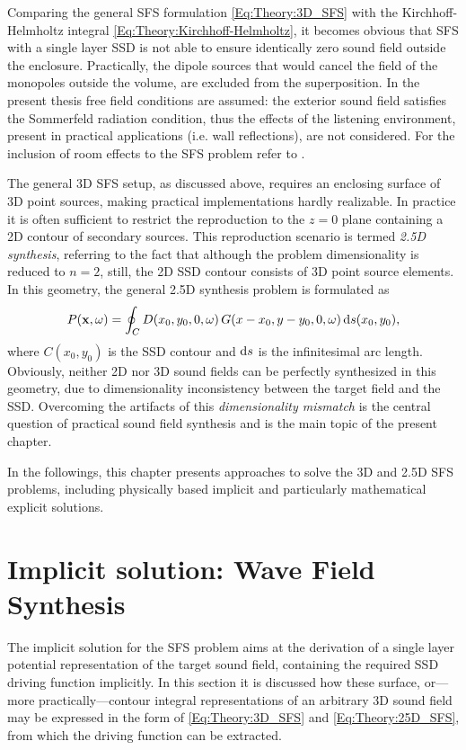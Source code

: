 Comparing the general SFS formulation \eqref{Eq:Theory:3D_SFS} with the Kirchhoff-Helmholtz integral \eqref{Eq:Theory:Kirchhoff-Helmholtz}, it becomes obvious that SFS with a single layer SSD is not able to ensure identically zero sound field outside the enclosure.
Practically, the dipole sources that would cancel the field of the monopoles outside the volume, are excluded from the superposition.
In the present thesis free field conditions are assumed: the exterior sound field satisfies the Sommerfeld radiation condition, thus the effects of the listening environment, present in practical applications (i.e. wall reflections), are not considered. 
For the inclusion of room effects to the SFS problem refer to \cite{Spors2005, app8010016}.

\vspace{3mm}
The general 3D SFS setup, as discussed above, requires an enclosing surface of 3D point sources, making practical implementations hardly realizable.
In practice it is often sufficient to restrict the reproduction to the $z=0$ plane containing a 2D contour of secondary sources.
This reproduction scenario is termed \emph{2.5D synthesis}, referring to the fact that although the problem dimensionality is reduced to $n=2$, still, the 2D SSD contour consists of 3D point source elements.
In this geometry, the general 2.5D synthesis problem is formulated as
\begin{equation}
P(\mathbf{x},\omega) = \oint_{C} D(x_0,y_0,0,\omega) \, G(x - x_0, y-y_0, 0 , \omega ) \, \mathrm{d} s( x_0, y_0 ),
\label{Eq:Theory:25D_SFS}
\end{equation}
where $C(x_0,y_0)$ is the SSD contour and $\mathrm{d} s$ is the infinitesimal arc length.
Obviously, neither 2D nor 3D sound fields can be perfectly synthesized in this geometry, due to dimensionality inconsistency between the target field and the SSD.
Overcoming the artifacts of this \emph{dimensionality mismatch} is the central question of practical sound field synthesis and is the main topic of the present chapter.

In the followings, this chapter presents approaches to solve the 3D and 2.5D SFS problems, including physically based implicit and particularly mathematical explicit solutions. 

\section{Implicit solution: Wave Field Synthesis}

The implicit solution for the SFS problem aims at the derivation of a single layer potential representation of the target sound field, containing the required SSD driving function implicitly.
In this section it is discussed how these surface, or---more practically---contour integral representations of an arbitrary 3D sound field may be expressed in the form of \eqref{Eq:Theory:3D_SFS} and \eqref{Eq:Theory:25D_SFS}, from which the driving function can be extracted.

